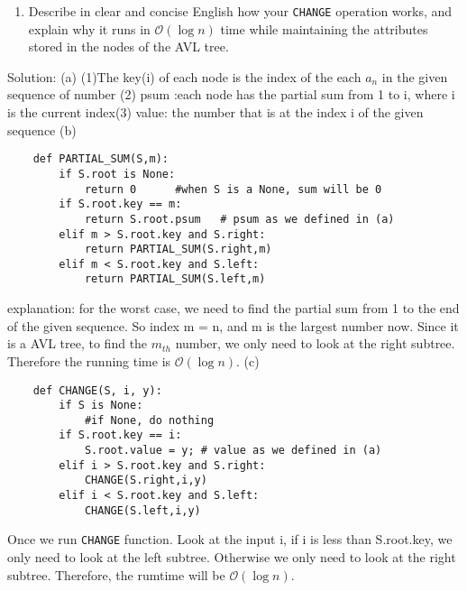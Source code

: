 \documentclass{assignment-263}
\begin{document}
\begin{enumerate}
\begin{enumerate}
			\item Describe in clear and concise English how your
				\texttt{CHANGE} operation works, and explain why it runs in
				$\mathcal{O}(\log n)$ time while maintaining the attributes
				stored in the nodes of the AVL tree.
		\end{enumerate}
Solution:\vskip5pt
(a) (1)The key(i) of each node is the index of the each $a_n$ in the given sequence of number (2) psum :each node has the partial sum from 1 to i, where i is the current index(3) value: the number that is at the index i of the given sequence\vskip5pt
(b)\begin{lstlisting}
    def PARTIAL_SUM(S,m):
        if S.root is None:
            return 0      #when S is a None, sum will be 0
        if S.root.key == m:
            return S.root.psum   # psum as we defined in (a)
        elif m > S.root.key and S.right: 
            return PARTIAL_SUM(S.right,m)
        elif m < S.root.key and S.left:
            return PARTIAL_SUM(S.left,m)  
\end{lstlisting}
explanation: for the worst case, we need to find the partial sum from 1 to the end of the given sequence. So index m = n, and m is the largest number now. Since it is a AVL tree, to find the $m_{th}$ number, we only need to look at the right subtree. Therefore the running time is $\mathcal{O}(\log n)$.\vskip5pt
(c)
\begin{lstlisting}
    def CHANGE(S, i, y):
        if S is None:
            #if None, do nothing
        if S.root.key == i:
            S.root.value = y; # value as we defined in (a)
        elif i > S.root.key and S.right: 
            CHANGE(S.right,i,y)
        elif i < S.root.key and S.left:
            CHANGE(S.left,i,y)  
\end{lstlisting}

Once we run \texttt{CHANGE} function. Look at the input i, if i is less than S.root.key, we only need to look at the left subtree. Otherwise we only need to look at the right subtree. Therefore, the rumtime will be  $\mathcal{O}(\log n)$.

\end{enumerate}

\program
\end{document}
